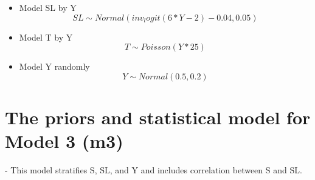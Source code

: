 \documentclass{article}
\begin{document}
\begin{itemize}
$$\overline{\alpha _S}, \overline{\beta _{S_Y}} \sim Normal(0,0.1)$$
$$\sigma_{\alpha _S}, \sigma _{\beta _{S_Y}} \sim Exponential(6)$$
$$z_{\alpha _S}[T] \sim Normal(0,0.1)$$
$$z _{\beta _{S_Y}}[T] ~ normal(0,0.1)$$
\begin{itemize}
    \item don't need regularization
\end{itemize}
$$\beta {S_{dS}} \sim Normal(0,0.3)$$
$$\sigma_S \sim Exponential(1)$$
$$\sigma_S \sim Exponential(1)$$

\item Model SL by Y 
$$SL \sim Normal(inv_logit(6 * Y - 2) - 0.04, 0.05)$$

\item Model T by Y  
$$T \sim Poisson(Y * 25)$$

\item Model Y randomly
$$Y \sim Normal(0.5, 0.2)$$

\end{itemize}




\newpage

\section{The priors and statistical model for Model 3 (m3)}
- This model stratifies S, SL, and Y and includes correlation between S and SL. 
\end{document}
